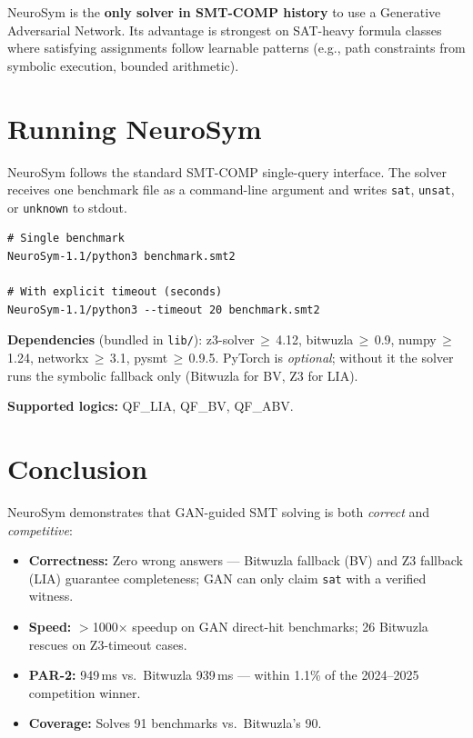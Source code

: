 \documentclass[10pt,twocolumn]{article}
\begin{document}
\noindent NeuroSym is the \textbf{only solver in SMT-COMP history} to
use a Generative Adversarial Network.
Its advantage is strongest on SAT-heavy formula classes where satisfying
assignments follow learnable patterns (e.g., path constraints from
symbolic execution, bounded arithmetic).

\section{Running NeuroSym}

NeuroSym follows the standard SMT-COMP single-query interface.
The solver receives one benchmark file as a command-line argument and
writes \texttt{sat}, \texttt{unsat}, or \texttt{unknown} to stdout.

\begin{verbatim}
# Single benchmark
NeuroSym-1.1/python3 benchmark.smt2

# With explicit timeout (seconds)
NeuroSym-1.1/python3 --timeout 20 benchmark.smt2
\end{verbatim}

\noindent\textbf{Dependencies} (bundled in \texttt{lib/}):
z3-solver\,$\geq$\,4.12, bitwuzla\,$\geq$\,0.9, numpy\,$\geq$\,1.24,
networkx\,$\geq$\,3.1, pysmt\,$\geq$\,0.9.5.
PyTorch is \emph{optional}; without it the solver runs the symbolic
fallback only (Bitwuzla for BV, Z3 for LIA).

\noindent\textbf{Supported logics:} QF\_LIA, QF\_BV, QF\_ABV.

\section{Conclusion}

NeuroSym demonstrates that GAN-guided SMT solving is both \emph{correct}
and \emph{competitive}:

\begin{itemize}
  \item \textbf{Correctness:} Zero wrong answers — Bitwuzla fallback (BV)
        and Z3 fallback (LIA) guarantee completeness; GAN can only claim
        \texttt{sat} with a verified witness.
  \item \textbf{Speed:} $>$1000$\times$ speedup on GAN direct-hit
        benchmarks; 26 Bitwuzla rescues on Z3-timeout cases.
  \item \textbf{PAR-2:} 949\,ms vs.\ Bitwuzla 939\,ms — within 1.1\%
        of the 2024--2025 competition winner.
  \item \textbf{Coverage:} Solves 91 benchmarks vs.\ Bitwuzla's 90.
\end{itemize}
\end{document}
